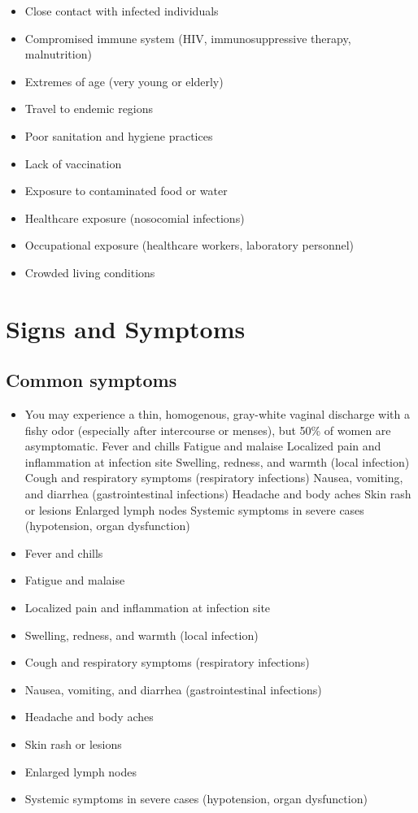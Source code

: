 \begin{itemize}[noitemsep]
  \item Close contact with infected individuals
  \item Compromised immune system (HIV, immunosuppressive therapy, malnutrition)
  \item Extremes of age (very young or elderly)
  \item Travel to endemic regions
  \item Poor sanitation and hygiene practices
  \item Lack of vaccination
  \item Exposure to contaminated food or water
  \item Healthcare exposure (nosocomial infections)
  \item Occupational exposure (healthcare workers, laboratory personnel)
  \item Crowded living conditions
\end{itemize}
\section{Signs and Symptoms}

\subsection{Common symptoms}
\begin{itemize}[noitemsep]
  \item You may experience a thin, homogenous, gray-white vaginal discharge with a fishy odor (especially after intercourse or menses), but 50\% of women are asymptomatic. Fever and chills Fatigue and malaise Localized pain and inflammation at infection site Swelling, redness, and warmth (local infection) Cough and respiratory symptoms (respiratory infections) Nausea, vomiting, and diarrhea (gastrointestinal infections) Headache and body aches Skin rash or lesions Enlarged lymph nodes Systemic symptoms in severe cases (hypotension, organ dysfunction)
  \item Fever and chills
  \item Fatigue and malaise
  \item Localized pain and inflammation at infection site
  \item Swelling, redness, and warmth (local infection)
  \item Cough and respiratory symptoms (respiratory infections)
  \item Nausea, vomiting, and diarrhea (gastrointestinal infections)
  \item Headache and body aches
  \item Skin rash or lesions
  \item Enlarged lymph nodes
  \item Systemic symptoms in severe cases (hypotension, organ dysfunction)
\end{itemize}

